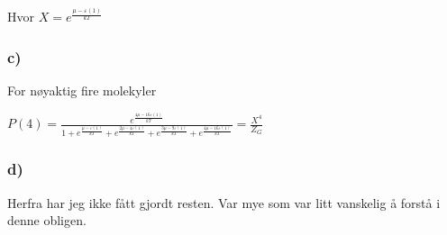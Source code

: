 \documentclass[12pt]{article}
\begin{document}
Hvor $X = e^{\frac{\mu - \varepsilon(1)}{kT}}$


\subsubsection*{c)}

For nøyaktig fire molekyler 


$P(4) = \frac{e^{\frac{4\mu - 16\varepsilon(1)}{kT}}}{1 + e^{\frac{\mu - \varepsilon(1)}{kT}} + e^{\frac{2\mu - 4\varepsilon(1)}{kT}} + e^{\frac{3\mu - 9\varepsilon(1)}{kT}} + e^{\frac{4\mu - 16\varepsilon(1)}{kT}}} = \frac{X^4}{Z_G} $ 

\subsubsection*{d)}

Herfra har jeg ikke fått gjordt resten. Var mye som var litt vanskelig å forstå i denne obligen. 
\end{document}

